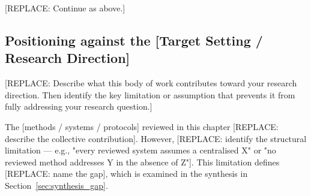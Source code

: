 [REPLACE: Continue as above.]


\subsection{Positioning against the [Target Setting / Research Direction]}
\label{sec:lit_cluster_N:positioning}


[REPLACE: Describe what this body of work contributes toward your research
direction. Then identify the key limitation or assumption that prevents it from
fully addressing your research question.]

The [methods / systems / protocols] reviewed in this chapter [REPLACE: describe
the collective contribution]. However, [REPLACE: identify the structural
limitation — e.g., "every reviewed system assumes a centralised X" or "no
reviewed method addresses Y in the absence of Z"]. This limitation defines
[REPLACE: name the gap], which is examined in the synthesis in
Section~\ref{sec:synthesis_gap}.
